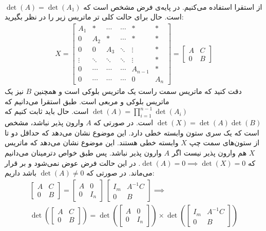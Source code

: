 \\
از استقرا استفاده می‌کنیم. در پایه‌ی فرض مشخص است که
$\det(A) = \det(A_1)$
است. حال برای حالت کلی تر ماتریس زیر را در نظر بگیرید:
\begin{gather*}
    X =
    \left[
        \begin{array}{ccccc|c}
            A_1 & * & \cdots & \cdots & * & *\\
            0 & A_2 & * & \cdots & * & *\\
            0 & 0 & A_3 & \ddots & \vdots & *\\
            \vdots & \ddots & \ddots & \ddots & \vdots & *\\
            0 & \cdots & \cdots & \cdots & A_{n-1} & *\\
            \hline
            0 & \cdots & \cdots & \cdots & 0 & A_n
        \end{array}
    \right]
    = \begin{bmatrix}
        A & C\\
        0 & B
    \end{bmatrix}
\end{gather*}
دقت کنید که ماتریس سمت راست یک ماتریس بلوکی است و همچنین
$B$
نیز یک ماتریس بلوکی و مربعی است. طبق استقرا می‌دانیم که
$\det(A) = \prod_{i=1}^{n-1} \det(A_i)$
است. حال باید ثابت کنیم که
$\det(X) = \det(A) \det(B)$
است. در صورتی که
$A$
وارون پذیر نباشد، مشخص است که یک سری ستون وابسته خطی دارد. این موضوع نشان می‌دهد که حداقل دو تا از ستون‌های
سمت چپ
$X$
وابسته خطی هستند. این موضوع نشان می‌دهد که ماتریس
$X$
هم وارون پذیر نیست اگر
$A$
وارون پذیر نباشد.
پس طبق خواص دترمینان می‌دانیم که
$\det(A) = 0 \implies \det(X) = 0$.
در این حالت فرض عوض نمی‌شود و بر قرار می‌ماند.
در صورتی که
$\det(A) \neq 0$
باشد داریم:
\begin{gather*}
    \begin{bmatrix} A & C \\ 0 & B\end{bmatrix} = \begin{bmatrix} A & 0 \\ 0 & I_n\end{bmatrix} \, \begin{bmatrix} I_m & A^{-1}C \\ 0 & B\end{bmatrix} \implies\\
    \det(\begin{bmatrix} A & C \\ 0 & B\end{bmatrix}) = \det(\begin{bmatrix} A & 0 \\ 0 & I_n\end{bmatrix}) \times \det(\begin{bmatrix} I_m & A^{-1}C \\ 0 & B\end{bmatrix})
\end{gather*}
